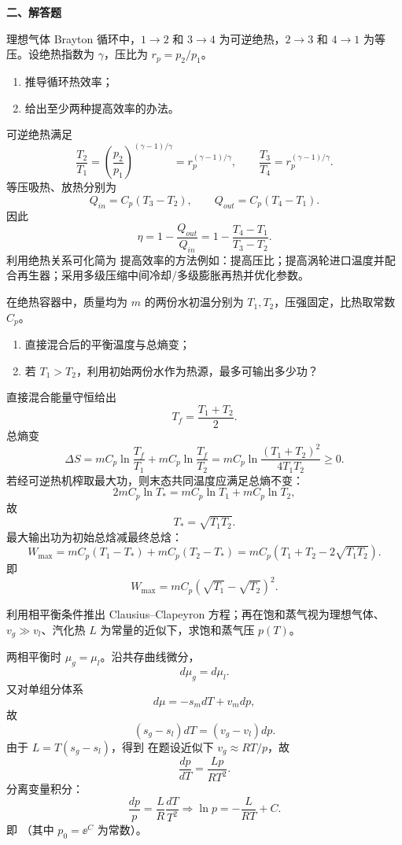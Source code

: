 \textbf{二、解答题}
\begin{question}
理想气体 Brayton 循环中，$1\to2$ 和 $3\to4$ 为可逆绝热，$2\to3$ 和 $4\to1$ 为等压。设绝热指数为 $\gamma$，压比为 $r_p=p_2/p_1$。
\begin{enumerate}[label=(\arabic*),leftmargin=2.8em,itemsep=0.2em]
\item 推导循环热效率；
\item 给出至少两种提高效率的办法。
\end{enumerate}
\begin{solution}

可逆绝热满足
\[
\frac{T_2}{T_1}=\left(\frac{p_2}{p_1}\right)^{(\gamma-1)/\gamma}=r_p^{(\gamma-1)/\gamma},
\qquad
\frac{T_3}{T_4}=r_p^{(\gamma-1)/\gamma}.
\]
等压吸热、放热分别为
\[
Q_{in}=C_p(T_3-T_2),
\qquad
Q_{out}=C_p(T_4-T_1).
\]
因此
\[
\eta=1-\frac{Q_{out}}{Q_{in}}=1-\frac{T_4-T_1}{T_3-T_2}.
\]
利用绝热关系可化简为
提高效率的方法例如：提高压比；提高涡轮进口温度并配合再生器；采用多级压缩中间冷却/多级膨胀再热并优化参数。
\end{solution}
\end{question}

\begin{question}
在绝热容器中，质量均为 $m$ 的两份水初温分别为 $T_1,T_2$，压强固定，比热取常数 $C_p$。
\begin{enumerate}[label=(\arabic*),leftmargin=2.8em,itemsep=0.2em]
\item 直接混合后的平衡温度与总熵变；
\item 若 $T_1>T_2$，利用初始两份水作为热源，最多可输出多少功？
\end{enumerate}
\begin{solution}

直接混合能量守恒给出
\[
T_f=\frac{T_1+T_2}{2}.
\]
总熵变
\[
\Delta S=mC_p\ln\frac{T_f}{T_1}+mC_p\ln\frac{T_f}{T_2}
=mC_p\ln\frac{(T_1+T_2)^2}{4T_1T_2}\ge0.
\]
若经可逆热机榨取最大功，则末态共同温度应满足总熵不变：
\[
2mC_p\ln T_* = mC_p\ln T_1+mC_p\ln T_2,
\]
故
\[
T_*=\sqrt{T_1T_2}.
\]
最大输出功为初始总焓减最终总焓：
\[
W_{\max}=mC_p(T_1-T_*)+mC_p(T_2-T_*)
= mC_p(T_1+T_2-2\sqrt{T_1T_2}).
\]
即
\[
W_{\max}=mC_p(\sqrt{T_1}-\sqrt{T_2})^2.
\]
\end{solution}
\end{question}

\begin{question}
利用相平衡条件推出 Clausius--Clapeyron 方程；再在饱和蒸气视为理想气体、$v_g\gg v_l$、汽化热 $L$ 为常量的近似下，求饱和蒸气压 $p(T)$。
\begin{solution}

两相平衡时 $\mu_g=\mu_l$。沿共存曲线微分，
\[
 d\mu_g=d\mu_l.
\]
又对单组分体系
\[
 d\mu=-s_m dT+v_m dp,
\]
故
\[
 (s_g-s_l)dT=(v_g-v_l)dp.
\]
由于 $L=T(s_g-s_l)$，得到
在题设近似下 $v_g\approx RT/p$，故
\[
\frac{dp}{dT}=\frac{Lp}{RT^2}.
\]
分离变量积分：
\[
\frac{dp}{p}=\frac{L}{R}\frac{dT}{T^2}
\Longrightarrow
\ln p=-\frac{L}{RT}+C.
\]
即
（其中 $p_0=\ee^{C}$ 为常数）。
\end{solution}
\end{question}

